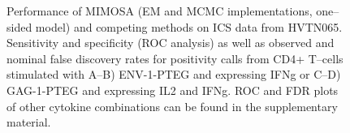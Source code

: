 \documentclass[11pt]{article}
\begin{document}
\begin{figure}[htbp] %
   \centering
   \caption{Performance of MIMOSA (EM and MCMC implementations, one--sided model) and competing methods on ICS data from HVTN065. Sensitivity and specificity (ROC analysis) as well as observed and nominal false discovery rates for positivity calls from CD4+ T--cells stimulated with A--B) ENV-1-PTEG and expressing IFNg or C--D) GAG-1-PTEG and expressing IL2 and IFNg. ROC and FDR plots of other cytokine combinations can be found in the supplementary material.}
\label{fig:HVTN065}
\end{figure}

\end{document}

